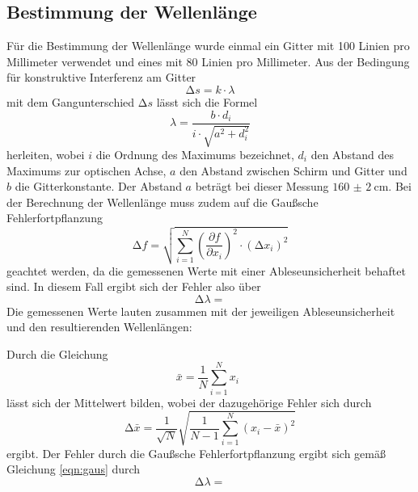 \subsection{Bestimmung der Wellenlänge}
Für die Bestimmung der Wellenlänge wurde einmal ein Gitter mit 100 Linien pro Millimeter
verwendet und eines mit 80 Linien pro Millimeter.
Aus der Bedingung für konstruktive Interferenz am Gitter
\begin{equation}
  \increment s = k \cdot \lambda
\end{equation}
mit dem Gangunterschied $\increment s$ lässt sich die Formel
\begin{equation}
  \lambda = \frac{b \cdot d_i}{i \cdot \sqrt{a^2+d_i^2}}
\end{equation}
herleiten, wobei $i$ die Ordnung des Maximums bezeichnet, $d_i$ den Abstand des
Maximums zur optischen Achse, $a$ den Abstand zwischen Schirm und Gitter und $b$ die
Gitterkonstante. Der Abstand $a$ beträgt bei dieser Messung $\SI{160(2)}{\centi\meter}$.
Bei der Berechnung der Wellenlänge muss zudem auf die Gaußsche Fehlerfortpflanzung
\begin{equation}
  \increment f = \sqrt{ \sum_{i=1}^N \left( \frac{\partial f}{\partial x_i}\right)^2
  \cdot (\increment x_i)^2  }
  \label{eqn:gaus}
\end{equation}
geachtet werden, da die gemessenen Werte mit einer Ableseunsicherheit behaftet sind.
In diesem Fall ergibt sich der Fehler also über
\begin{equation}
  \increment \lambda =
\end{equation}
Die gemessenen Werte lauten zusammen mit der jeweiligen Ableseunsicherheit und den resultierenden
Wellenlängen:

Durch die Gleichung
\begin{equation}
  \bar{x} = \frac{1}{N} \sum_{i=1}^{N} x_i \: \:
  \label{eqn:mit}
\end{equation}
\noindent lässt sich der Mittelwert bilden, wobei der dazugehörige Fehler sich durch
\begin{equation}
  \increment \bar{x} = \frac{1}{\sqrt{N}} \sqrt{ \frac{1}{N-1} \sum_{i=1}^N
  (x_i - \bar{x})^2}
  \label{eqn:mitf}
\end{equation}
ergibt. Der Fehler durch die Gaußsche Fehlerfortpflanzung ergibt sich gemäß Gleichung
\ref{eqn:gaus} durch
\begin{equation}
  \increment \lambda =
\end{equation}
